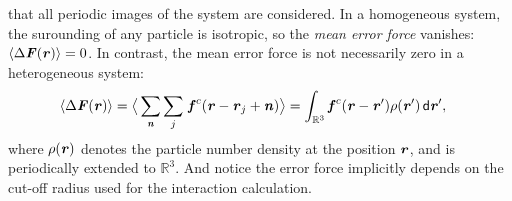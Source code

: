 \documentclass[aps,pre,preprint]{revtex4}
\renewcommand{\v}[1]{\textbf{\textit{#1}}}
\renewcommand{\d}[1]{\textsf{#1}}
\begin{document}
that all periodic images of the system are considered. In a
homogeneous system, the surounding of any particle is isotropic, so
the \emph{mean error force} vanishes: $\langle\Delta\v F(\v r)\rangle
= 0$. In contrast, the mean error force is not necessarily zero in a
heterogeneous system:
\begin{align} \label{eqn:tmp3} %
  \langle\Delta\v F(\v r)\rangle
  &=
  \big\langle
  \sum_{\v n}\sum_{j}\, \v f^c(\v r - \v r_j + \v n)
  \big\rangle 
  =
  \int_{\mathbb R^3}\v f^c(\v r - \v r')\rho(\v r')\,\d d\v r',
\end{align}
where $\rho(\v r)$ denotes the particle number density at the position
$\v r$, and is periodically extended to $\mathbb R^3$. And notice the
error force implicitly depends on the cut-off radius used for the
interaction calculation.
\end{document}
